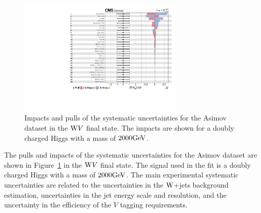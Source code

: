 \begin{figure}[!htbp]
\centering
\includegraphics[width=0.7\textwidth]{Plots/plots/impacts_datacard.pdf}
\caption{Impacts and pulls of the systematic uncertainties for the Asimov dataset in the $\mathrm{W} V$ final state. The impacts are shown for a doubly charged Higgs with a mass of $2000\mathrm{GeV}$.  
}
\label{fig:pulls}
\end{figure}
The pulls and impacts of the systematic uncertainties for the Asimov dataset are shown in Figure~\ref{fig:pulls} in the  $\mathrm{W} V$ final state. The signal used in the fit is a doubly charged Higgs with a mass of $2000\mathrm{GeV}$. The main experimental systematic uncertainties are related to the uncertainties in the $\mathrm{W}$+jets background estimation, uncertainties in the jet energy scale and resolution, and  the uncertainty in the efficiency of the $V$ tagging requirements. 





